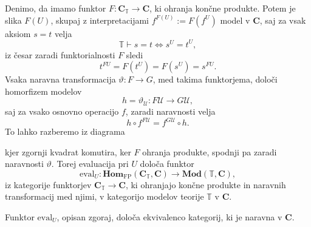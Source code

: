 \documentclass[../kategoricna_logika.tex]{subfiles}
\begin{document}
Denimo, da imamo funktor $F : \mathbf{C}_{\mathbb{T}} \to \mathbf{C}$,
ki ohranja končne produkte.
Potem je slika $F(U)$, skupaj z interpretacijami
$f^{F(U)} := F(f^U)$ model v $\mathbf{C}$, saj za
vsak aksiom $s = t$ velja
$$\mathbb{T} \vdash s = t  \iff  s^U = t^U,$$
%
iz česar zaradi funktorialnosti $F$ sledi
$$t^{FU} = F(t^U) = F(s^U) = s^{FU}.$$
%
Vsaka naravna transformacija $\vartheta : F \to G$, med takima
funktorjema, določi homorfizem modelov
$$h = \vartheta_\mathcal{U} : F\mathcal{U} \to G\mathcal{U},$$
%
saj za vsako osnovno operacijo $f$, zaradi naravnosti velja
$$h \circ f^{F\mathcal{U}} = f^{G\mathcal{U}} \circ h.$$
To lahko razberemo iz diagrama
\begin{center}
\end{center}
kjer zgornji kvadrat komutira, ker $F$ ohranja produkte, spodnji
pa zaradi naravnosti $\vartheta$. Torej evaluacija pri $U$ določa funktor
\[ \mathrm{eval}_U : \mathbf{Hom}_{\mathrm{FP}}(\mathbf{C}_{\mathbb{T}}, \mathbf{C}) \to \mathbf{Mod}(\mathbb{T}, \mathbf{C}), \]
iz kategorije funktorjev $\mathbf{C}_{\mathbb{T}} \to \mathbf{C}$,
ki ohranjajo končne produkte in naravnih transformacij med njimi,
v kategorijo modelov teorije $\mathbb{T}$ v $\mathbf{C}$.
\begin{trditev}\label{trditev:modeli-so-funktorji}
  Funktor $\mathrm{eval}_U$, opisan zgoraj, določa ekvivalenco kategorij,
  ki je naravna v $\mathbf{C}$.
\end{trditev}
\end{document}

